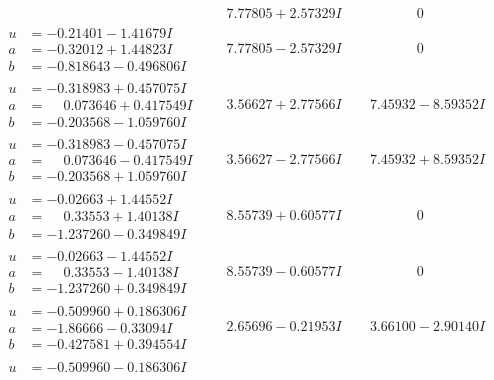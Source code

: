 \documentclass[1p]{elsarticle_modified}
\theoremstyle{definition}
\begin{document}
$$\begin{array}{c|c|c}
 & \phantom{-}7.77805 + 2.57329 I & \phantom{-0.000000 } 0 \\ \hline\begin{aligned}
u &= -0.21401 - 1.41679 I \\
a &= -0.32012 + 1.44823 I \\
b &= -0.818643 - 0.496806 I\end{aligned}
 & \phantom{-}7.77805 - 2.57329 I & \phantom{-0.000000 } 0 \\ \hline\begin{aligned}
u &= -0.318983 + 0.457075 I \\
a &= \phantom{-}0.073646 + 0.417549 I \\
b &= -0.203568 - 1.059760 I\end{aligned}
 & \phantom{-}3.56627 + 2.77566 I & \phantom{-}7.45932 - 8.59352 I \\ \hline\begin{aligned}
u &= -0.318983 - 0.457075 I \\
a &= \phantom{-}0.073646 - 0.417549 I \\
b &= -0.203568 + 1.059760 I\end{aligned}
 & \phantom{-}3.56627 - 2.77566 I & \phantom{-}7.45932 + 8.59352 I \\ \hline\begin{aligned}
u &= -0.02663 + 1.44552 I \\
a &= \phantom{-}0.33553 + 1.40138 I \\
b &= -1.237260 - 0.349849 I\end{aligned}
 & \phantom{-}8.55739 + 0.60577 I & \phantom{-0.000000 } 0 \\ \hline\begin{aligned}
u &= -0.02663 - 1.44552 I \\
a &= \phantom{-}0.33553 - 1.40138 I \\
b &= -1.237260 + 0.349849 I\end{aligned}
 & \phantom{-}8.55739 - 0.60577 I & \phantom{-0.000000 } 0 \\ \hline\begin{aligned}
u &= -0.509960 + 0.186306 I \\
a &= -1.86666 - 0.33094 I \\
b &= -0.427581 + 0.394554 I\end{aligned}
 & \phantom{-}2.65696 - 0.21953 I & \phantom{-}3.66100 - 2.90140 I \\ \hline\begin{aligned}
u &= -0.509960 - 0.186306 I \\

\end{aligned}
\end{array}$$
\end{document}
